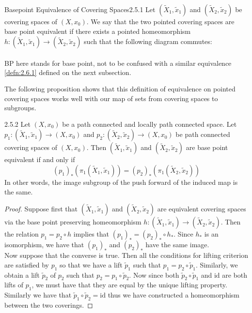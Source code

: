 \documentclass[a4paper]{article}
\begin{document}
\begin{defn}{Basepoint Equivalence of Covering Spaces}{2.5.1} Let $(\widetilde{X}_1,\widetilde{x}_1)$ and $(\widetilde{X}_2,\widetilde{x}_2)$ be covering spaces of $(X,x_0)$. We say that the two pointed covering spaces are base point equivalent if there exists a pointed homeomorphism $h:(\widetilde{X}_1,\widetilde{x}_1)\to(\widetilde{X}_2,\widetilde{x}_2)$ such that the following diagram commutes: \\
\\
BP here stands for base point, not to be confused with a similar equivalence \ref{defn:2.6.1} defined on the next subsection. 
\end{defn}

The following proposition shows that this definition of equivalence on pointed covering spaces works well with our map of sets from covering spaces to subgroups. 

\begin{prp}{}{2.5.2} Let $(X,x_0)$ be a path connected and locally path connected space. Let $p_1:(\widetilde{X}_1,\widetilde{x}_1)\to(X,x_0)$ and $p_2:(\widetilde{X}_2,\widetilde{x}_2)\to(X,x_0)$ be path connected covering spaces of $(X,x_0)$. Then $(\widetilde{X}_1,\widetilde{x}_1)$ and $(\widetilde{X}_2,\widetilde{x}_2)$ are base point equivalent if and only if $$(p_1)_\ast\left(\pi_1(\widetilde{X}_1,\widetilde{x}_1)\right)=(p_2)_\ast\left(\pi_1(\widetilde{X}_2,\widetilde{x}_2)\right)$$ In other words, the image subgroup of the push forward of the induced map is the same. 
\begin{proof}
Suppose first that $(\widetilde{X}_1,\widetilde{x}_1)$ and $(\widetilde{X}_2,\widetilde{x}_2)$ are equivalent covering spaces via the base point preserving homeomorphism $h:(\widetilde{X}_1,\widetilde{x}_1)\to(\widetilde{X}_2,\widetilde{x}_2)$. Then the relation $p_1=p_2\circ h$ implies that $(p_1)_\ast=(p_2)_\ast\circ h_\ast$. Since $h_\ast$ is an isomorphism, we have that $(p_1)_\ast$ and $(p_2)_\ast$ have the same image. \\

Now suppose that the converse is true. Then all the conditions for lifting criterion are satisfied by $p_1$ so that we have a lift $\widetilde{p}_1$ such that $p_1=p_2\circ\widetilde{p}_1$. Similarly, we obtain a lift $\widetilde{p}_2$ of $p_2$ such that $p_2=p_1\circ\widetilde{p}_2$. Now since both $\widetilde{p}_2\circ\widetilde{p}_1$ and $\text{id}$ are both lifts of $p_1$, we must have that they are equal by the unique lifting property. Similarly we have that $\widetilde{p}_1\circ\widetilde{p}_2=\text{id}$ thus we have constructed a homeomorphism between the two coverings. 
\end{proof}
\end{prp}
\end{document}
